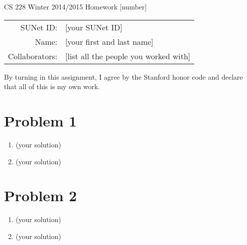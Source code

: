 \documentclass[12pt]{article}
\begin{document}
\begin{center}
{\Large CS 228 Winter 2014/2015 Homework [number]}

\begin{tabular}{rl}
SUNet ID: & [your SUNet ID] \\
Name: & [your first and last name] \\
Collaborators: & [list all the people you worked with]
\end{tabular}
\end{center}

By turning in this assignment, I agree by the Stanford honor code and declare
that all of this is my own work.

\section*{Problem 1}

\begin{enumerate}[label=(\alph*)]
  \item (your solution)
  \item (your solution)
\end{enumerate}

\section*{Problem 2}

\begin{enumerate}[label=(\alph*)]
  \item (your solution)
  \item (your solution)
\end{enumerate}
\end{document}

